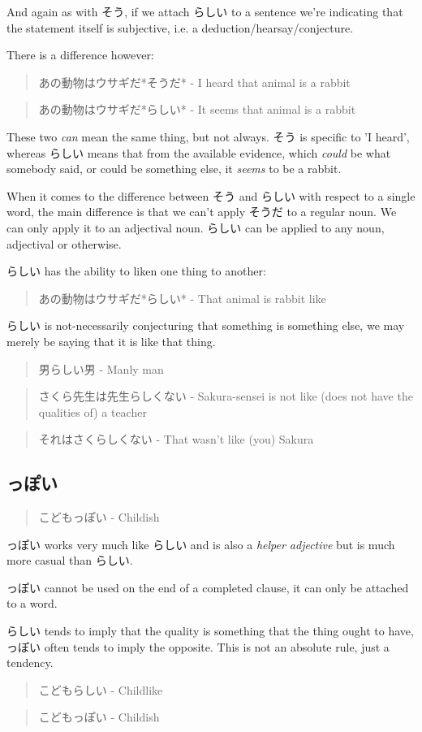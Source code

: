 \documentclass[11pt]{article}
\begin{document}
And again as with そう, if we attach らしい to a sentence we're indicating that the statement itself is subjective, i.e. a deduction/hearsay/conjecture.

There is a difference however:
\begin{quote}
あの動物はウサギだ*そうだ* - I heard that animal is a rabbit
\end{quote}
\begin{quote}
あの動物はウサギだ*らしい* - It seems that animal is a rabbit
\end{quote}
These two \emph{can} mean the same thing, but not always. そう is specific to 'I heard', whereas らしい means that from the available evidence, which \emph{could} be what somebody said, or could be something else, it \emph{seems} to be a rabbit.

When it comes to the difference between そう and らしい with respect to a single word, the main difference is that we can't apply そうだ to a regular noun. We can only apply it to an adjectival noun. らしい can be applied to any noun, adjectival or otherwise.

らしい has the ability to liken one thing to another:
\begin{quote}
あの動物はウサギだ*らしい* - That animal is rabbit like
\end{quote}
らしい is not-necessarily conjecturing that something is something else, we may merely be saying that it is like that thing.
\begin{quote}
男らしい男 - Manly man
\end{quote}
\begin{quote}
さくら先生は先生らしくない - Sakura-sensei is not like (does not have the qualities of) a teacher
\end{quote}
\begin{quote}
それはさくらしくない - That wasn't like (you) Sakura
\end{quote}

\subsection{っぽい}
\label{sec:org3bf98ef}
\begin{quote}
こどもっぽい - Childish
\end{quote}
っぽい works very much like らしい and is also a \emph{helper adjective} but is much more casual than らしい.

っぽい cannot be used on the end of a completed clause, it can only be attached to a word.

らしい tends to imply that the quality is something that the thing ought to have, っぽい often tends to imply the opposite. This is not an absolute rule, just a tendency.
\begin{quote}
こどもらしい - Childlike
\end{quote}
\begin{quote}
こどもっぽい - Childish
\end{quote}
\end{document}
